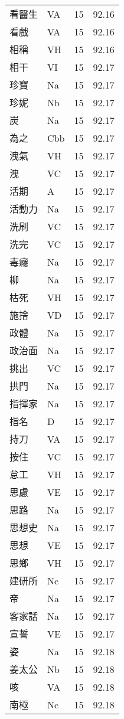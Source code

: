 \documentclass[twocolumn]{book}
\begin{document}
\begin{supertabular}{llrr}
看醫生 & VA & 15 &  92.16\\
看戲 & VA & 15 &  92.16\\
相稱 & VH & 15 &  92.16\\
相干 & VI & 15 &  92.17\\
珍寶 & Na & 15 &  92.17\\
珍妮 & Nb & 15 &  92.17\\
炭 & Na & 15 &  92.17\\
為之 & Cbb & 15 &  92.17\\
洩氣 & VH & 15 &  92.17\\
洩 & VC & 15 &  92.17\\
活期 & A & 15 &  92.17\\
活動力 & Na & 15 &  92.17\\
洗刷 & VC & 15 &  92.17\\
洗完 & VC & 15 &  92.17\\
毒癮 & Na & 15 &  92.17\\
柳 & Na & 15 &  92.17\\
枯死 & VH & 15 &  92.17\\
施捨 & VD & 15 &  92.17\\
政體 & Na & 15 &  92.17\\
政治面 & Na & 15 &  92.17\\
挑出 & VC & 15 &  92.17\\
拱門 & Na & 15 &  92.17\\
指揮家 & Na & 15 &  92.17\\
指名 & D & 15 &  92.17\\
持刀 & VA & 15 &  92.17\\
按住 & VC & 15 &  92.17\\
怠工 & VH & 15 &  92.17\\
思慮 & VE & 15 &  92.17\\
思路 & Na & 15 &  92.17\\
思想史 & Na & 15 &  92.17\\
思想 & VE & 15 &  92.17\\
思鄉 & VH & 15 &  92.17\\
建研所 & Nc & 15 &  92.17\\
帝 & Na & 15 &  92.17\\
客家話 & Na & 15 &  92.17\\
宣誓 & VE & 15 &  92.17\\
姿 & Na & 15 &  92.18\\
姜太公 & Nb & 15 &  92.18\\
咳 & VA & 15 &  92.18\\
南極 & Nc & 15 &  92.18\\

\end{supertabular}
\end{document}
